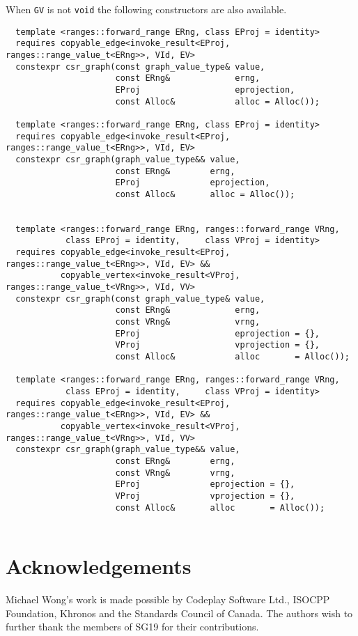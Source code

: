 \documentclass[10pt,onecolumn]{article}
\newcommand{\tcode}[1]{\lstinline[breaklines=true]{#1}}
\begin{document}
When \tcode{GV} is not \tcode{void} the following constructors are also available.

\begin{lstlisting}
  template <ranges::forward_range ERng, class EProj = identity>
  requires copyable_edge<invoke_result<EProj, ranges::range_value_t<ERng>>, VId, EV>
  constexpr csr_graph(const graph_value_type& value, 
                      const ERng&             erng, 
                      EProj                   eprojection, 
                      const Alloc&            alloc = Alloc());
  
  template <ranges::forward_range ERng, class EProj = identity>
  requires copyable_edge<invoke_result<EProj, ranges::range_value_t<ERng>>, VId, EV>
  constexpr csr_graph(graph_value_type&& value,
                      const ERng&        erng, 
                      EProj              eprojection, 
                      const Alloc&       alloc = Alloc());


  template <ranges::forward_range ERng, ranges::forward_range VRng,
            class EProj = identity,     class VProj = identity>
  requires copyable_edge<invoke_result<EProj, ranges::range_value_t<ERng>>, VId, EV> &&
           copyable_vertex<invoke_result<VProj, ranges::range_value_t<VRng>>, VId, VV>
  constexpr csr_graph(const graph_value_type& value,
                      const ERng&             erng,
                      const VRng&             vrng,
                      EProj                   eprojection = {},
                      VProj                   vprojection = {},
                      const Alloc&            alloc       = Alloc());

  template <ranges::forward_range ERng, ranges::forward_range VRng,
            class EProj = identity,     class VProj = identity>
  requires copyable_edge<invoke_result<EProj, ranges::range_value_t<ERng>>, VId, EV> &&
           copyable_vertex<invoke_result<VProj, ranges::range_value_t<VRng>>, VId, VV>
  constexpr csr_graph(graph_value_type&& value,
                      const ERng&        erng,
                      const VRng&        vrng,
                      EProj              eprojection = {},
                      VProj              vprojection = {},
                      const Alloc&       alloc       = Alloc());


\end{lstlisting}



\section{Acknowledgements}
Michael Wong's work is made possible by Codeplay Software Ltd., ISOCPP Foundation, Khronos and the Standards Council of Canada.  The authors wish to further thank the members of SG19 for their contributions.

\footnotesize


\normalsize
\end{document}

